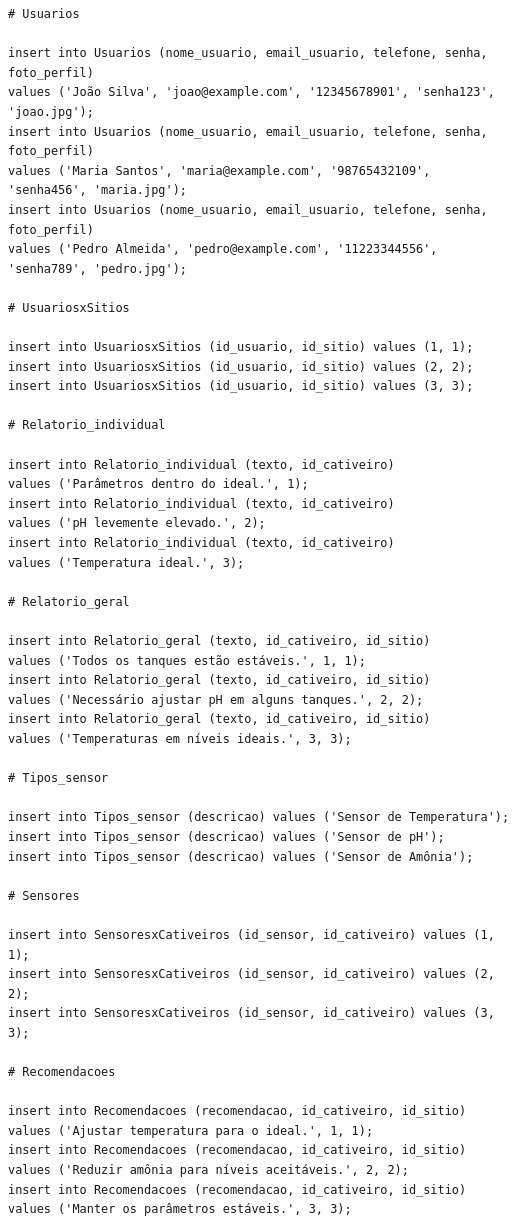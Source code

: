 \documentclass[
  a4paper,
  12pt,
  english,
  brazilian,
]{article}
\begin{document}
\begin{verbatim}
# Usuarios

insert into Usuarios (nome_usuario, email_usuario, telefone, senha, foto_perfil) 
values ('João Silva', 'joao@example.com', '12345678901', 'senha123', 'joao.jpg');
insert into Usuarios (nome_usuario, email_usuario, telefone, senha, foto_perfil) 
values ('Maria Santos', 'maria@example.com', '98765432109', 'senha456', 'maria.jpg');
insert into Usuarios (nome_usuario, email_usuario, telefone, senha, foto_perfil) 
values ('Pedro Almeida', 'pedro@example.com', '11223344556', 'senha789', 'pedro.jpg');

# UsuariosxSitios

insert into UsuariosxSitios (id_usuario, id_sitio) values (1, 1);
insert into UsuariosxSitios (id_usuario, id_sitio) values (2, 2);
insert into UsuariosxSitios (id_usuario, id_sitio) values (3, 3);

# Relatorio_individual

insert into Relatorio_individual (texto, id_cativeiro) 
values ('Parâmetros dentro do ideal.', 1);
insert into Relatorio_individual (texto, id_cativeiro) 
values ('pH levemente elevado.', 2);
insert into Relatorio_individual (texto, id_cativeiro) 
values ('Temperatura ideal.', 3);

# Relatorio_geral

insert into Relatorio_geral (texto, id_cativeiro, id_sitio)
values ('Todos os tanques estão estáveis.', 1, 1);
insert into Relatorio_geral (texto, id_cativeiro, id_sitio) 
values ('Necessário ajustar pH em alguns tanques.', 2, 2);
insert into Relatorio_geral (texto, id_cativeiro, id_sitio) 
values ('Temperaturas em níveis ideais.', 3, 3);

# Tipos_sensor

insert into Tipos_sensor (descricao) values ('Sensor de Temperatura');
insert into Tipos_sensor (descricao) values ('Sensor de pH');
insert into Tipos_sensor (descricao) values ('Sensor de Amônia');

# Sensores

insert into SensoresxCativeiros (id_sensor, id_cativeiro) values (1, 1);
insert into SensoresxCativeiros (id_sensor, id_cativeiro) values (2, 2);
insert into SensoresxCativeiros (id_sensor, id_cativeiro) values (3, 3);

# Recomendacoes

insert into Recomendacoes (recomendacao, id_cativeiro, id_sitio) 
values ('Ajustar temperatura para o ideal.', 1, 1);
insert into Recomendacoes (recomendacao, id_cativeiro, id_sitio) 
values ('Reduzir amônia para níveis aceitáveis.', 2, 2);
insert into Recomendacoes (recomendacao, id_cativeiro, id_sitio) 
values ('Manter os parâmetros estáveis.', 3, 3);

\end{verbatim}
\end{document}
